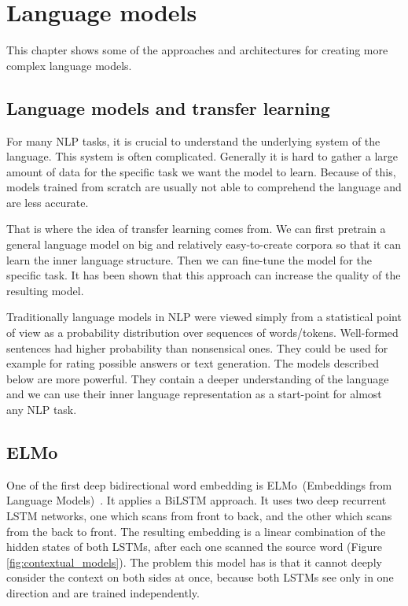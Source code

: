 \documentclass[
  digital, %
  table,   %
  twoside, %
  lof,     %
  lot,     %
]{fithesis3}
\begin{document}

\chapter{Language models}
This chapter shows some of the approaches and architectures for creating more complex language models.

\section{Language models and transfer learning}
For many NLP tasks, it is crucial to understand the underlying system of the language. This system is often complicated. Generally it is hard to gather a large amount of data for the specific task we want the model to learn. Because of this, models trained from scratch are usually not able to comprehend the language and are less accurate.

That is where the idea of transfer learning comes from. We can first pretrain a general language model on big and relatively easy-to-create corpora so that it can learn the inner language structure. Then we can fine-tune the model for the specific task. It has been shown that this approach can increase the quality of the resulting model.

Traditionally language models in NLP were viewed simply from a statistical point of view as a probability distribution over sequences of words/tokens. Well-formed sentences had higher probability than nonsensical ones. They could be used for example for rating possible answers or text generation. The models described below are more powerful. They contain a deeper understanding of the language and we can use their inner language representation as a start-point for almost any NLP task.

 \section{ELMo}
One of the first deep bidirectional word embedding is ELMo~(Embeddings from Language Models)~\parencite{elmo}. It applies a BiLSTM approach. It uses two deep recurrent LSTM networks, one which scans from front to back, and the other which scans from the back to front. The resulting embedding is a linear combination of the hidden states of both LSTMs, after each one scanned the source word (Figure \ref{fig:contextual_models}). The problem this model has is that it cannot deeply consider the context on both sides at once, because both LSTMs see only in one direction and are trained independently. 
\end{document}
